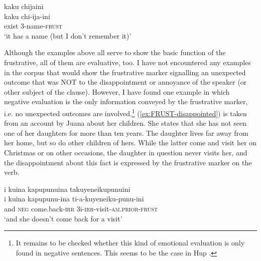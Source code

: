 \ea\label{ex:FRUST-VAIN-3}
\begingl 
\glpreamble kaku chijaini\\
\gla kaku chi-ija-ini\\ 
\glb exist 3-name-\textsc{frust}\\ 
\glft ‘it has a name (but I don’t remember it)’
\trailingcitation{[jxx-a120516l-a.233]}
\xe


Although the examples above all serve to show the basic function of the frustrative, all of them are evaluative, too. I have not encountered any examples in the corpus that would show the frustrative marker  signalling an unexpected outcome that was NOT to the disappointment or annoyance of the speaker (or other subject of the clause). However, I have found one example in which negative evaluation is the only information conveyed by the frustrative marker, i.e. no unexpected outcomes are involved.\footnote{It remains to be checked whether this kind of emotional evaluation is only found in negative sentences. This seems to be the case in Hup \citep[cf.][878]{Epps2008}.} (\ref{ex:FRUST-disappointed}) is taken from an account by Juana about her children. She states that she has not seen one of her daughters for more than ten years. The daughter lives far away from her home, but so do other children of hers. While the latter come and visit her on Christmas or on other occasions, the daughter in question never visits her, and the disappointment about this fact is expressed by the frustrative marker on the verb.

\ea\label{ex:FRUST-disappointed}
\begingl 
\glpreamble i kuina kapupunuina takuyeneikupunuini\\
\gla i kuina kapupunu-ina ti-a-kuyeneiku-punu-ini\\ 
\glb and \textsc{neg} come.back-\textsc{irr} 3i-\textsc{irr}-visit-\textsc{am.prior}-\textsc{frust}\\ 
\glft ‘and she doesn’t come back for a visit’
\trailingcitation{[jxx-p120430l-1.313]}
\xe


